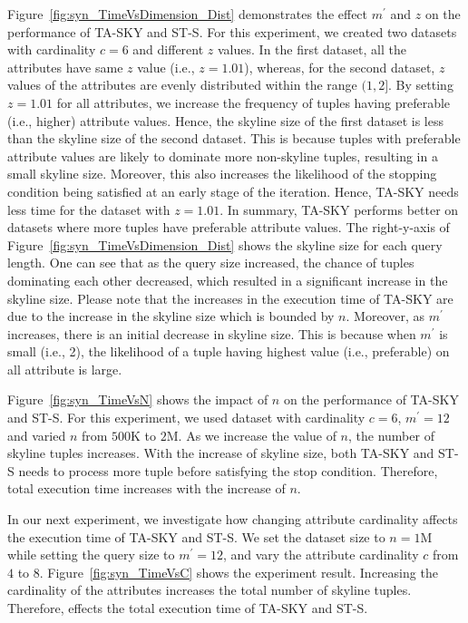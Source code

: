 Figure~\ref{fig:syn_TimeVsDimension_Dist} demonstrates the effect $m^\prime$ and $z$ on the performance of TA-SKY and ST-S. For this experiment, we created two datasets with cardinality $c = 6$ and different $z$ values. In the first dataset, all the attributes have same $z$ value (i.e., $z=1.01$), whereas, for the second dataset, $z$ values of the attributes are evenly distributed within the range $(1, 2]$. By setting $z = 1.01$ for all attributes, we increase the frequency of tuples having preferable (i.e., higher) attribute values. Hence, the skyline size of the first dataset is less than the skyline size of the second dataset. This is because tuples with preferable attribute values are likely to dominate more non-skyline tuples, resulting in a small skyline size. Moreover, this also increases the likelihood of the stopping condition being satisfied at an early stage of the iteration. Hence, TA-SKY needs less time for the dataset with $z = 1.01$. In summary, TA-SKY performs better on datasets where more tuples have preferable attribute values.
The right-y-axis of Figure~\ref{fig:syn_TimeVsDimension_Dist} shows the skyline size for each query length. One can see that as the query size increased, the chance of tuples dominating each other decreased, which resulted in a significant increase in the skyline size. Please note that the increases in the execution time of TA-SKY are due to the increase in the skyline size which is bounded by $n$. Moreover, as $m^\prime$ increases, there is an initial decrease in skyline size. This is because when $m^\prime$ is small (i.e., 2), the likelihood of a tuple having highest value (i.e., preferable) on all attribute is large.



\vspace{1mm}
 Figure~\ref{fig:syn_TimeVsN} shows the impact of $n$ on the performance of TA-SKY and ST-S. For this experiment, we used dataset with cardinality $c=6$, $m^\prime=12$ and varied $n$ from $500$K to $2$M. As we increase the value of $n$, the number of skyline tuples increases. With the increase of skyline size, both TA-SKY and ST-S needs to process more tuple before satisfying the stop condition. Therefore, total execution time increases with the increase of $n$.


\vspace{1mm}
 In our next experiment, we investigate how changing attribute cardinality affects the execution time of TA-SKY and ST-S. We set the dataset size to $n=1$M while setting the query size to $m^\prime = 12$, and vary the attribute cardinality $c$ from $4$ to $8$. Figure~\ref{fig:syn_TimeVsC} shows the experiment result. Increasing the cardinality of the attributes increases the total number of skyline tuples. Therefore, effects the total execution time of TA-SKY and ST-S.

